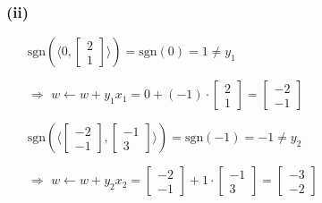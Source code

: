 \documentclass[12pt]{article}
\begin{document}
\subsubsection*{(ii)}
\begin{itemize}
\item[] $\text{sgn}(\langle 0, \begin{bmatrix} 2 \\ 1 \end{bmatrix}\rangle)
=\text{sgn}(0)=1\neq y_1$
\item[$\Rightarrow$] $w\leftarrow w+y_1x_1 = 0 + (-1)\cdot\begin{bmatrix} 2 \\ 1 \end{bmatrix} 
= \begin{bmatrix} -2 \\ -1 \end{bmatrix}$
\item[] $\text{sgn}(\langle \begin{bmatrix} -2 \\ -1 \end{bmatrix}, \begin{bmatrix} -1 \\ 3 \end{bmatrix}\rangle)
=\text{sgn}(-1)=-1\neq y_2$
\item[$\Rightarrow$] $w\leftarrow w+y_2x_2 = \begin{bmatrix} -2 \\ -1 \end{bmatrix} + 1\cdot\begin{bmatrix} -1 \\ 3 \end{bmatrix} 
= \begin{bmatrix} -3 \\ -2 \end{bmatrix}$
\end{itemize}
\end{document}
